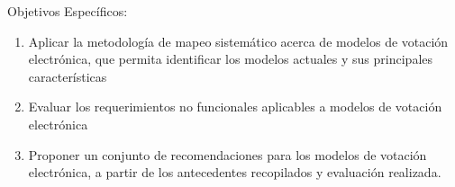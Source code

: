 Objetivos Específicos: 

\begin{enumerate}

	\item Aplicar la metodología de mapeo sistemático acerca de modelos de 
	votación electrónica, que permita identificar los modelos actuales y 
	sus principales características

	\item Evaluar los requerimientos no funcionales aplicables a modelos de 
	votación electrónica 

	\item Proponer un conjunto de recomendaciones para los modelos de 
	votación electrónica, a partir de los antecedentes recopilados y 
	evaluación realizada.

\end{enumerate}

